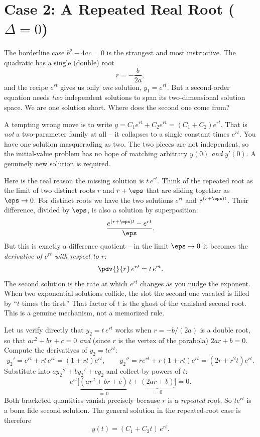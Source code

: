 \section{Case 2: A Repeated Real Root ($\Delta = 0$)}
\label{ch38:repeated-root}

The borderline case $b^2 - 4ac = 0$ is the strangest and most instructive. The
quadratic has a single (double) root
\[
  r = -\frac{b}{2a},
\]
and the recipe $e^{rt}$ gives us only \emph{one} solution, $y_1 = e^{rt}$. But a
second-order equation needs \emph{two} independent solutions to span its
two-dimensional solution space. We are one solution short. Where does the second
one come from?

\begin{trapbox}
A tempting wrong move is to write $y = C_1 e^{rt} + C_2 e^{rt} = (C_1 + C_2)
e^{rt}$. That is \emph{not} a two-parameter family at all -- it collapses to a
single constant times $e^{rt}$. You have one solution masquerading as two. The
two pieces are not independent, so the initial-value problem has no hope of
matching arbitrary $y(0)$ \emph{and} $y'(0)$. A genuinely new solution is
required.
\end{trapbox}

\begin{happeningbox}
Here is the real reason the missing solution is $t\,e^{rt}$. Think of the
repeated root as the limit of two distinct roots $r$ and $r + \eps$ that are
sliding together as $\eps \to 0$. For distinct roots we have the two solutions
$e^{rt}$ and $e^{(r+\eps)t}$. Their difference, divided by $\eps$, is also a
solution by superposition:
\[
  \frac{e^{(r+\eps)t} - e^{rt}}{\eps}.
\]
But this is exactly a difference quotient -- in the limit $\eps \to 0$ it becomes
the \emph{derivative of $e^{rt}$ with respect to $r$}:
\[
  \pdv{}{r}\, e^{rt} = t\,e^{rt}.
\]
The second solution is the rate at which $e^{rt}$ changes as you nudge the
exponent. When two exponential solutions collide, the slot the second one
vacated is filled by ``$t$ times the first.'' That factor of $t$ is the ghost of
the vanished second root. This is a genuine mechanism, not a memorized rule.
\end{happeningbox}

Let us verify directly that $y_2 = t\,e^{rt}$ works when $r = -b/(2a)$ is a double
root, so that $a r^2 + b r + c = 0$ \emph{and} (since $r$ is the vertex of the
parabola) $2 a r + b = 0$. Compute the derivatives of $y_2 = t e^{rt}$:
\[
  y_2' = e^{rt} + r t\, e^{rt} = (1 + rt)e^{rt},
  \qquad
  y_2'' = r e^{rt} + r(1+rt)e^{rt} = (2r + r^2 t)e^{rt}.
\]
Substitute into $a y_2'' + b y_2' + c y_2$ and collect by powers of $t$:
\[
  e^{rt}\Big[\underbrace{(a r^2 + b r + c)}_{=\,0}\, t
  + \underbrace{(2 a r + b)}_{=\,0}\Big] = 0.
\]
Both bracketed quantities vanish precisely because $r$ is a \emph{repeated} root.
So $t e^{rt}$ is a bona fide second solution. The general solution in the
repeated-root case is therefore
\begin{equation}
  \boxed{\,y(t) = (C_1 + C_2 t)\,e^{rt}.\,}
  \label{ch38:repeated-general}
\end{equation}

